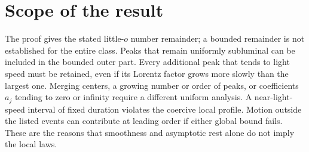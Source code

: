 \documentclass[11pt]{article}
\begin{document}
\section{Scope of the result}

The proof gives the stated little-$o$ number remainder; a bounded
remainder is not established for the entire class. Peaks that
remain uniformly subluminal can be included in the bounded outer
part. Every additional peak that tends to light speed must be
retained, even if its Lorentz factor grows more slowly than the
largest one. Merging centers, a growing number or order of peaks,
or coefficients $a_j$ tending to zero or infinity require a
different uniform analysis. A near-light-speed interval of fixed
duration violates the coercive local profile. Motion outside the
listed events can contribute at leading order if either global
bound fails. These are the reasons that smoothness and asymptotic
rest alone do not imply the local laws.



\end{document}

